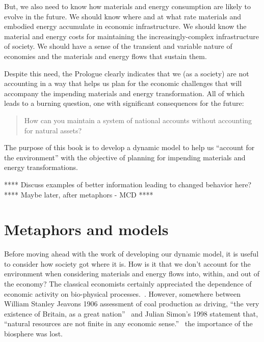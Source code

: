 But, we also need to know how materials and energy consumption 
are likely to evolve in the future.
We should know where and at what rate 
materials and embodied energy accumulate 
in economic infrastructure. 
We should know the material and energy costs for maintaining the
increasingly-complex infrastructure of society.
We should have a sense of the transient and variable nature of economies
and the materials and energy flows that sustain them.

Despite this need,
the Prologue clearly indicates that we (as a society) 
are not accounting in a way that helps us plan 
for the economic challenges that will accompany 
the impending materials and energy transformation.
All of which leads to a burning question,
one with significant consequences for the future:

\begin{quote}
	How can you maintain a system of national accounts without accounting for natural assets?
\end{quote}

The purpose of this book is to develop a dynamic model to help us
``account for the environment''
with the objective of planning for impending materials and energy transformations.

**** Discuss examples of better information leading to changed behavior here? ****
Maybe later, after metaphors - MCD ****


\section{Metaphors and models}
\label{sec:metaphors_and_models}


Before moving ahead with the work of developing our dynamic model,
it is useful to consider how society got where it is. 
How is it that we don't account for the environment when 
considering materials and energy flows into, within, and out of the economy?
The classical economists certainly appreciated the dependence of
economic activity on bio-physical processes.~\cite{Cleveland1987, Hall2011, Dale2012}.
However, somewhere between William Stanley Jeavons 1906 assessment of 
coal production as driving, ``the very existence of Britain, as a great nation''~\cite[p.57]{Jevons1906}
and Julian Simon's 1998 statement that, 
``natural resources are not finite in any economic sense.''~\cite[p.54]{Simon1998}
the importance of the biosphere was lost.

